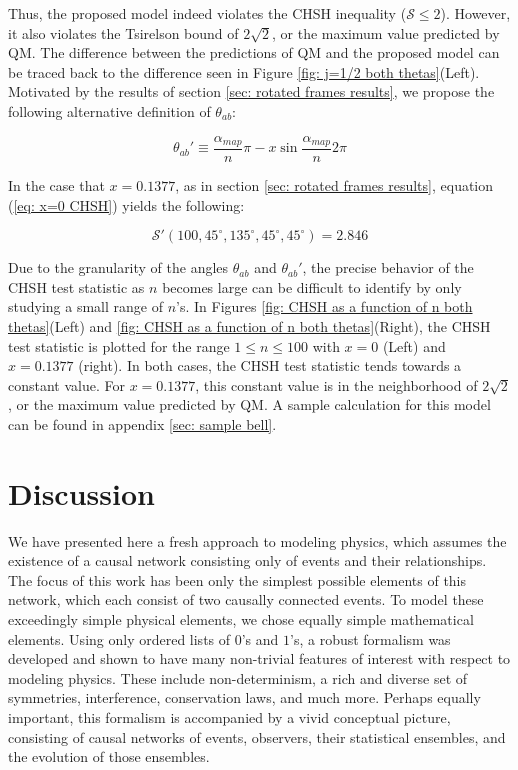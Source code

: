 \documentclass{article}
\begin{document}
Thus, the proposed model indeed violates the CHSH inequality ($\mathcal{S}\leq 2$). However, it also violates the Tsirelson bound of $2\sqrt{2}$, or the maximum value predicted by QM. The difference between the predictions of QM and the proposed model can be traced back to the difference seen in Figure \ref{fig: j=1/2 both thetas}(Left). Motivated by the results of section \ref{sec: rotated frames results}, we propose the following alternative definition of $\theta_{ab}$:

\begin{equation}
    \theta_{ab}'\equiv \frac{\alpha_{map}}{n}\pi - x\sin{\frac{\alpha_{map}}{n}2\pi}
    \label{eq: theta_ab prime}
\end{equation}

In the case that $x=0.1377$, as in section \ref{sec: rotated frames results}, equation (\ref{eq: x=0 CHSH}) yields the following:

\begin{equation}
    \mathcal{S}'(100,45^{\circ},135^{\circ},45^{\circ},45^{\circ})=2.846
     \label{eq: x=0.1377 CHSH}
\end{equation}

Due to the granularity of the angles $\theta_{ab}$ and $\theta_{ab}'$, the precise behavior of the CHSH test statistic as $n$ becomes large can be difficult to identify by only studying a small range of $n$'s. In Figures \ref{fig: CHSH as a function of n both thetas}(Left) and \ref{fig: CHSH as a function of n both thetas}(Right), the CHSH test statistic is plotted for the range $1\leq n \leq 100$ with $x=0$ (Left) and $x=0.1377$ (right). In both cases, the CHSH test statistic tends towards a constant value. For $x=0.1377$, this constant value is in the neighborhood of $2\sqrt{2}$, or the maximum value predicted by QM. A sample calculation for this model can be found in appendix \ref{sec: sample bell}.

\section{Discussion \label{sec: Discussion}}

We have presented here a fresh approach to modeling physics, which assumes the existence of a causal network consisting only of events and their relationships. The focus of this work has been only the simplest possible elements of this network, which each consist of two causally connected events. To model these exceedingly simple physical elements, we chose equally simple mathematical elements. Using only ordered lists of $0$'s and $1$'s, a robust formalism was developed and shown to have many non-trivial features of interest with respect to modeling physics. These include non-determinism, a rich and diverse set of symmetries, interference, conservation laws, and much more. Perhaps equally important, this formalism is accompanied by a vivid conceptual picture, consisting of causal networks of events, observers, their statistical ensembles, and the evolution of those ensembles. 
\end{document}
